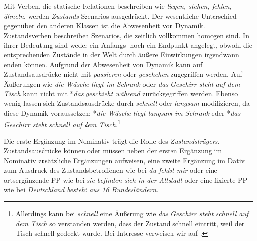 Mit Verben, die statische Relationen beschreiben wie \textit{liegen, stehen, fehlen, ähneln}, werden \textit{Zustands}-Szenarios ausgedrückt. Der wesentliche Unterschied gegenüber den anderen Klassen ist die Abwesenheit von Dynamik. Zustandsverben beschreiben Szenarios, die zeitlich vollkommen homogen sind. In ihrer Bedeutung sind weder ein Anfangs- noch ein Endpunkt angelegt, obwohl die entsprechenden Zustände in der Welt durch äußere Einwirkungen irgendwann enden können. Aufgrund der Abwesenheit von Dynamik kann auf Zustandsausdrücke nicht mit \textit{passieren} oder \textit{geschehen} zugegriffen werden. Auf Äußerungen wie \textit{die Wäsche liegt im Schrank} oder \textit{das Geschirr steht auf dem Tisch} kann nicht mit *\textit{das geschieht während} zurückgegriffen werden. Ebenso wenig lassen sich Zustandsausdrücke durch \textit{schnell} oder \textit{langsam} modifizieren, da diese Dynamik voraussetzen: *\textit{die Wäsche liegt langsam im Schrank} oder *\textit{das Geschirr steht schnell auf dem Tisch}.\footnote{Allerdings kann bei \textit{schnell} eine Äußerung wie \textit{das Geschirr steht schnell auf dem Tisch} so verstanden werden, dass der Zustand schnell eintritt, weil der Tisch schnell gedeckt wurde. Bei Interesse verweisen wir auf \citet[61]{Maienborn2003}.}

Die erste Ergänzung im Nominativ trägt die Rolle des \textit{Zustandsträgers}. Zustandsausdrücke können oder müssen neben der ersten Ergänzung im Nominativ zusätzliche Ergänzungen aufweisen, \zB eine zweite Ergänzung im Dativ zum Ausdruck des Zustandsbetroffenen wie bei \textit{du fehlst mir} oder eine ortsergänzende PP wie bei \textit{sie befinden sich in der Altstadt} oder eine fixierte PP wie bei \textit{Deutschland besteht aus 16 Bundesländern}.   

